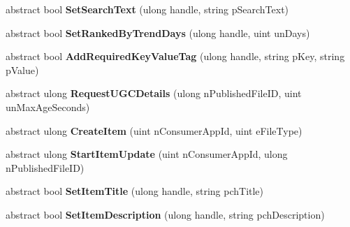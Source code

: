 \begin{DoxyCompactItemize}
abstract bool {\bfseries Set\+Search\+Text} (ulong handle, string p\+Search\+Text)
\item 
\mbox{\label{class_valve_1_1_steamworks_1_1_i_steam_u_g_c_abe56fcce02e5d2f2ebeed829ffcc777c}} 
abstract bool {\bfseries Set\+Ranked\+By\+Trend\+Days} (ulong handle, uint un\+Days)
\item 
\mbox{\label{class_valve_1_1_steamworks_1_1_i_steam_u_g_c_a145feefdc0d09afde80d0f590ee5e23b}} 
abstract bool {\bfseries Add\+Required\+Key\+Value\+Tag} (ulong handle, string p\+Key, string p\+Value)
\item 
\mbox{\label{class_valve_1_1_steamworks_1_1_i_steam_u_g_c_ad6f931d4eaf5408fe973ec11cc8a1ab5}} 
abstract ulong {\bfseries Request\+U\+G\+C\+Details} (ulong n\+Published\+File\+ID, uint un\+Max\+Age\+Seconds)
\item 
\mbox{\label{class_valve_1_1_steamworks_1_1_i_steam_u_g_c_a80d4eb9c577bb96c08d3caf61ec267e4}} 
abstract ulong {\bfseries Create\+Item} (uint n\+Consumer\+App\+Id, uint e\+File\+Type)
\item 
\mbox{\label{class_valve_1_1_steamworks_1_1_i_steam_u_g_c_ace761f860ad25d731128f5f51adc7765}} 
abstract ulong {\bfseries Start\+Item\+Update} (uint n\+Consumer\+App\+Id, ulong n\+Published\+File\+ID)
\item 
\mbox{\label{class_valve_1_1_steamworks_1_1_i_steam_u_g_c_a1b98a0a29af0665d85fb0daf87387824}} 
abstract bool {\bfseries Set\+Item\+Title} (ulong handle, string pch\+Title)
\item 
\mbox{\label{class_valve_1_1_steamworks_1_1_i_steam_u_g_c_a6f03670294cd1e38fe18e196e811c695}} 
abstract bool {\bfseries Set\+Item\+Description} (ulong handle, string pch\+Description)
\item 
\mbox{\label{class_valve_1_1_steamworks_1_1_i_steam_u_g_c_a57daaf283f40de7e53d3aa2d8889361e}} 

\end{DoxyCompactItemize}
